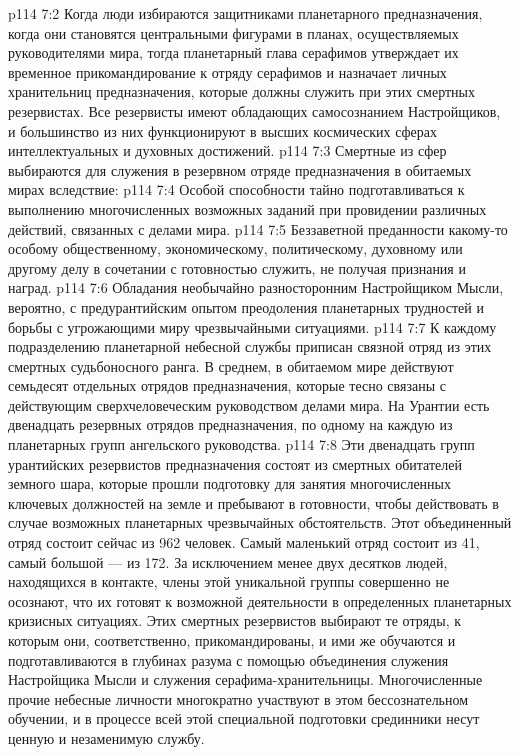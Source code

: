 \vs p114 7:2 Когда люди избираются защитниками планетарного предназначения, когда они становятся центральными фигурами в планах, осуществляемых руководителями мира, тогда планетарный глава серафимов утверждает их временное прикомандирование к отряду серафимов и назначает личных хранительниц предназначения, которые должны служить при этих смертных резервистах. Все резервисты имеют обладающих самосознанием Настройщиков, и большинство из них функционируют в высших космических сферах интеллектуальных и духовных достижений.
\vs p114 7:3 Смертные из сфер выбираются для служения в резервном отряде предназначения в обитаемых мирах вследствие:
\vs p114 7:4 \bibnobreakspace Особой способности тайно подготавливаться к выполнению многочисленных возможных заданий при провидении различных действий, связанных с делами мира.
\vs p114 7:5 \bibnobreakspace Беззаветной преданности какому\hyp{}то особому общественному, экономическому, политическому, духовному или другому делу в сочетании с готовностью служить, не получая признания и наград.
\vs p114 7:6 \bibnobreakspace Обладания необычайно разносторонним Настройщиком Мысли, вероятно, с предурантийским опытом преодоления планетарных трудностей и борьбы с угрожающими миру чрезвычайными ситуациями.
\vs p114 7:7 \pc К каждому подразделению планетарной небесной службы приписан связной отряд из этих смертных судьбоносного ранга. В среднем, в обитаемом мире действуют семьдесят отдельных отрядов предназначения, которые тесно связаны с действующим сверхчеловеческим руководством делами мира. На Урантии есть двенадцать резервных отрядов предназначения, по одному на каждую из планетарных групп ангельского руководства.
\vs p114 7:8 Эти двенадцать групп урантийских резервистов предназначения состоят из смертных обитателей земного шара, которые прошли подготовку для занятия многочисленных ключевых должностей на земле и пребывают в готовности, чтобы действовать в случае возможных планетарных чрезвычайных обстоятельств. Этот объединенный отряд состоит сейчас из 962 человек. Самый маленький отряд состоит из 41, самый большой --- из 172. За исключением менее двух десятков людей, находящихся в контакте, члены этой уникальной группы совершенно не осознают, что их готовят к возможной деятельности в определенных планетарных кризисных ситуациях. Этих смертных резервистов выбирают те отряды, к которым они, соответственно, прикомандированы, и ими же обучаются и подготавливаются в глубинах разума с помощью объединения служения Настройщика Мысли и служения серафима\hyp{}хранительницы. Многочисленные прочие небесные личности многократно участвуют в этом бессознательном обучении, и в процессе всей этой специальной подготовки срединники несут ценную и незаменимую службу.
